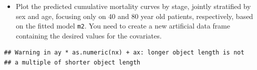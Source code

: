 \documentclass[
]{book}
\newenvironment{Shaded}{\begin{snugshade}}{\end{snugshade}}
\newcommand{\AttributeTok}[1]{\textcolor[rgb]{0.13,0.29,0.53}{#1}}
\newcommand{\CommentTok}[1]{\textcolor[rgb]{0.56,0.35,0.01}{\textit{#1}}}
\newcommand{\DecValTok}[1]{\textcolor[rgb]{0.00,0.00,0.81}{#1}}
\newcommand{\FunctionTok}[1]{\textcolor[rgb]{0.13,0.29,0.53}{\textbf{#1}}}
\newcommand{\NormalTok}[1]{#1}
\newcommand{\OtherTok}[1]{\textcolor[rgb]{0.56,0.35,0.01}{#1}}
\newcommand{\SpecialCharTok}[1]{\textcolor[rgb]{0.81,0.36,0.00}{\textbf{#1}}}
\newcommand{\StringTok}[1]{\textcolor[rgb]{0.31,0.60,0.02}{#1}}
\providecommand{\tightlist}{%
  \setlength{\itemsep}{0pt}\setlength{\parskip}{0pt}}
\begin{document}
\begin{itemize}
\tightlist
\item
  Plot the predicted cumulative mortality curves by stage, jointly
  stratified by sex and age, focusing only on 40 and 80 year old
  patients, respectively, based on the fitted model \texttt{m2}. You need to
  create a new artificial data frame containing the desired values for
  the covariates.
\end{itemize}

\begin{Shaded}
\end{Shaded}

\begin{verbatim}
## Warning in ay * as.numeric(nx) + ax: longer object length is not
## a multiple of shorter object length
\end{verbatim}
\end{document}
